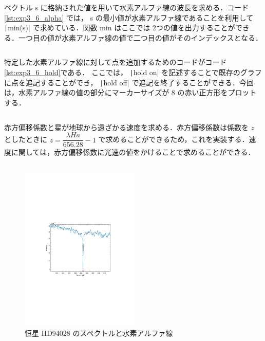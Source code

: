 \documentclass[dvipdfmx, titlepage]{jsarticle}
\begin{document}
    ベクトル s に格納された値を用いて水素アルファ線の波長を求める．コード \ref{lst:exp3_6_alpha} では， s の最小値が水素アルファ線であることを利用して \texttt|min(s)| で求めている．関数 min はここでは 2つの値を出力することができる．一つ目の値が水素アルファ線の値で二つ目の値がそのインデックスとなる．

    \inputminted[linenos, firstline=20, lastline=23, frame=lines, fontsize=\small]{matlab}{code/Exp3_6_Matlab.m}

    特定した水素アルファ線に対して点を追加するためのコードがコード\ref{lst:exp3_6_hold}である． ここでは， \texttt|hold on| を記述することで既存のグラフに点を追記することができ， \texttt|hold off| で追記を終了することができる．今回は，水素アルファ線の値の部分にマーカーサイズが 8 の赤い正方形をプロットする．
    \inputminted[linenos, firstline=24, lastline=27, frame=lines, fontsize=\small]{matlab}{code/Exp3_6_Matlab.m}
    
    赤方偏移係数と星が地球から遠ざかる速度を求める．赤方偏移係数は係数を $z$ としたときに $z = \dfrac{\lambda Ha }{656.28} - 1$ で求めることができるため，これを実装する．速度に関しては，赤方偏移係数に光速の値をかけることで求めることができる．
    \inputminted[linenos, firstline=29, lastline=31, frame=lines, fontsize=\small]{matlab}{code/Exp3_6_Matlab.m}

    \begin{figure}
        \centering
        \includegraphics[width=0.5\textwidth]{figure/stellar1.pdf}
        \caption{恒星 HD94028 のスペクトルと水素アルファ線}
        \label{fig:exp3_6_spectra}
    \end{figure}
\end{document}
